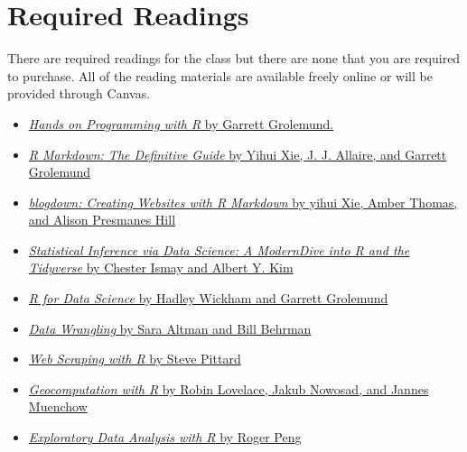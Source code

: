 \documentclass[11pt]{article}
\begin{document}
\section{Required Readings}
There are required readings for the class but there are none that you are required to purchase. All of the reading materials are available freely online or will be provided through Canvas. 

\begin{itemize}
\item \href{https://rstudio-education.github.io/hopr/index.html}{\textit{Hands on Programming with R} by Garrett Grolemund.}
\item  \href{https://bookdown.org/yihui/rmarkdown/}{\textit{R Markdown: The Definitive Guide} by Yihui Xie, J. J. Allaire, and Garrett Grolemund}
\item  \href{https://bookdown.org/yihui/blogdown/}{\textit{blogdown: Creating Websites with R Markdown} by yihui Xie, Amber Thomas, and Alison Presmanes Hill}
\item \href{https://moderndive.com/index.html}{\textit{Statistical Inference via Data Science: A ModernDive into R and the Tidyverse} by Chester Ismay and Albert Y. Kim}
\item \href{https://r4ds.had.co.nz/index.html}{\textit{R for Data Science} by Hadley Wickham and Garrett Grolemund}
\item \href{https://dcl-wrangle.stanford.edu/index.html}{\textit{Data Wrangling} by Sara Altman and Bill Behrman}
\item \href{https://steviep42.github.io/webscraping/book/}{\textit{Web Scraping with R} by Steve Pittard}
\item \href{https://geocompr.robinlovelace.net/}{\textit{Geocomputation with R} by Robin Lovelace, Jakub Nowosad, and Jannes Muenchow}
\item \href{https://bookdown.org/rdpeng/exdata/}{\textit{Exploratory Data Analysis with R} by Roger Peng}
\end{itemize}
\end{document}
